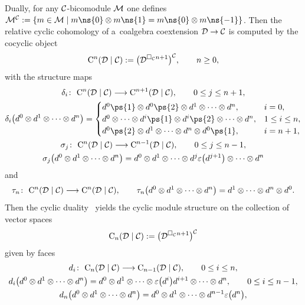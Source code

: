 Dually, for any ${\cal C}$-bicomodule ${\cal M}$ one def\/ines ${\cal M}^{\cal C}:=\{m\in {\cal M}\mid m\ns{0}\otimes
m\ns{1} =m\ns{0}\otimes m\ns{-1}\}$. Then the relative cyclic cohomology of a~coalgebra coextension ${\cal
D}\rightarrow {\cal C}$ is computed by the cocyclic object
\begin{gather}
\label{aux-rel-cyclic-coalg}
{\rm C}^n({\cal D}\mid{\cal C}):=\big({\cal D}^{\Box_{\cal C} n+1}\big)^{\cal C},
\qquad
n\geq 0,
\end{gather}
with the structure maps
\begin{gather*}%
\delta_i\colon \ {\rm C}^n({\cal D}\mid{\cal C}) \longrightarrow {\rm C}^{n+1}({\cal D}\mid{\cal C}),
\qquad
0 \leq j \leq n+1,
\\
\delta_i\big(d^0\otimes d^1\otimes \cdots\otimes d^n\big)
=\begin{cases}
d^0\ps{1}\otimes d^0\ps{2}\otimes d^1\otimes \cdots\otimes d^n, & i =0,
\\
d^0\otimes \cdots \otimes  d^i\ps{1}\otimes d^i\ps{2}\otimes \cdots \otimes d^n, & 1 \leq i\leq n,
\\
d^0\ps{2}\otimes d^1\otimes \cdots\otimes d^n\otimes d^0\ps{1}, & i =n+1,
\end{cases}
\\
\sigma_j\colon \ {\rm C}^n({\cal D}\mid{\cal C}) \longrightarrow {\rm C}^{n-1}({\cal D}\mid{\cal C}),
\qquad
0 \leq j \leq n-1,
\\
\sigma_j\big(d^0\otimes d^1\otimes \cdots\otimes d^n\big) =d^0\otimes d^1\otimes \cdots \otimes
d^{j}\varepsilon\big(d^{j+1}\big)\otimes \cdots \otimes d^n
\end{gather*}
and
\begin{gather*}%
\tau_n\colon \ {\rm C}^n({\cal D}\mid{\cal C}) \longrightarrow {\rm C}^n({\cal D}\mid{\cal C}),
\qquad
\tau_n\big(d^0\otimes d^1\otimes \cdots\otimes d^n\big) =d^1\otimes \cdots\otimes d^n\otimes d^0.
\end{gather*}
Then the cyclic duality~\cite{Conn83,KhalRang05} yields the cyclic module structure on the collection of vector spaces
\begin{gather}
\label{cyc-mod-coext}
{\rm C}_n({\cal D}\mid{\cal C}):=\big({\cal D}^{\Box_{\cal C} n+1}\big)^{\cal C}
\end{gather}
given by faces
\begin{gather*}%
d_i\colon \ {\rm C}_n({\cal D}\mid{\cal C}) \longrightarrow {\rm C}_{n-1}({\cal D}\mid{\cal C}),
\qquad
0 \leq i \leq n,
\\
d_i\big(d^0\otimes d^1\otimes \cdots\otimes d^n\big) =d^0\otimes d^1\otimes \cdots \otimes \varepsilon\big(d^i\big)d^{i+1}\otimes\cdots \otimes d^n,
\qquad
0 \leq i \leq n-1,
\\
d_n\big(d^0\otimes d^1\otimes \cdots\otimes d^n\big) =d^0\otimes d^1\otimes \cdots \otimes d^{n-1}\varepsilon\big(d^n\big),
\end{gather*}
